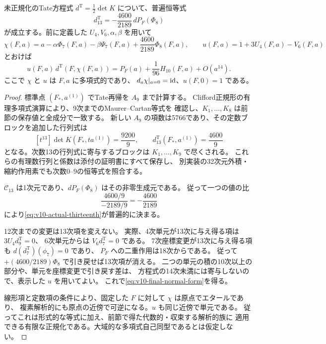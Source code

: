 \begin{proposition}
\label{prop:v10-explicit-thirteenth}
未正規化のTate方程式 $d^{\mathrm T}=\tfrac12\det K$ について、普遍恒等式
\begin{equation}\label{eq:v10-actual-thirteenth}
 d^{\mathrm T}_{13}=-\frac{4600}{2189}\,dP_F(\Phi_8)
\end{equation}
が成立する。前に定義した $U_4,V_6,\alpha,\beta$ を用いて
\[
 \chi(F,a)=a-\alpha\Phi_7(F,a)-\beta\Psi_7(F,a)
                         +\frac{4600}{2189}\Phi_8(F,a),
 \qquad u(F,a)=1+3U_4(F,a)-V_6(F,a)
\]
とおけば
\begin{equation}\label{eq:v10-final-normal-form}
 \boxed{
 u(F,a)\,d^{\mathrm T}(F,\chi(F,a))
   =P_F(a)+\frac1{96}H_{10}(F,a)+O(a^{14}).
 }
\end{equation}
ここで $\chi$ と $u$ は $F,a$ に多項式的であり、
$d_a\chi|_{a=0}=\operatorname{id}$、$u(F,0)=1$ である。
\end{proposition}
\begin{proof}
標準点 $(F_*,a^{(1)})$ でTate再帰を $A_9$ まで計算する。
Clifford正規形の有理多項式演算により、9次までのMaurer--Cartan等式を
確認し、$K_1,\ldots,K_8$ は前節の保存値と全成分で一致する。
新しい $A_9$ の項数は5766であり、その定数ブロックを追加した行列式は
\[
 [t^{13}]\det K(F_*,t a^{(1)})=\frac{9200}{9},\qquad
 d^{\mathrm T}_{13}(F_*,a^{(1)})=\frac{4600}{9}
\]
となる。次数13の行列式に寄与するブロックは $K_1,\ldots,K_9$ で尽くされる。
これらの有理数行列と係数は添付の証明書にすべて保存し、
別実装の32次元外積・縮約作用素でも次数0--9の恒等式を照合する。

$\mathcal C_{13}$ は1次元であり、$dP_F(\Phi_8)$ はその非零生成元である。
従って一つの値の比
\[
 \frac{4600/9}{-2189/9}=-\frac{4600}{2189}
\]
により\eqref{eq:v10-actual-thirteenth}が普遍的に決まる。

12次までの変更は13次項を変えない。
実際、4次単元が13次に与え得る項は $3U_4d^{\mathrm T}_9=0$、
6次単元からは $V_6d^{\mathrm T}_7=0$ である。
7次座標変更が13次に与え得る項も $d(d^{\mathrm T}_7)(\phi_7)=0$ であり、
$P_F$ への二重作用は18次からである。
従って $+(4600/2189)\Phi_8$ で引き戻せば13次項が消える。
二つの単元の積の10次以上の部分や、単元を座標変更で引き戻す差は、
方程式の14次未満には寄与しないので、表示した $u$ を用いてよい。
これで\eqref{eq:v10-final-normal-form}を得る。

線形項と定数項の条件により、固定した $F$ に対して $\chi$ は原点でエタールであり、
複素解析的にも原点の近傍で可逆になる。$u$ も同じ近傍で単元である。
従ってこれは形式的な等式に加え、前節で得た代数的・収束する解析的族に
適用できる有限な正規化である。大域的な多項式自己同型であるとは仮定しない。
\end{proof}

